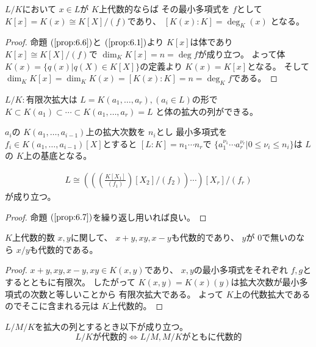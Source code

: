 \documentclass[../master_galois_theory]{subfiles}
\begin{document}
\begin{prop} \label{prop:6.7}
  $L/K$において $x \in L$が $K$上代数的ならば
  その最小多項式を $f$として
  $K[x] = K(x) \cong K[X]/(f)$であり、
  $[K(x):K] = \deg_K (x)$
  となる。
\end{prop}

\begin{proof}
  命題 $(\mathrm{\ref{prop:6.6}})$と $(\mathrm{\ref{prop:6.1}})$より
  $K[x]$は体であり
  $K[x] \cong K[X]/(f)$で $\dim_K K[x] = n = \deg f$が成り立つ。
  よって体 $K(x) = \{ q(x) | q(X) \in K[X] \}$の定義より
  $K(x) = K[x]$となる。
  そして $\dim_K K[x] = \dim_K K(x) = [K(x):K] = n = \deg_K f$である。
\end{proof}

\begin{corl} \label{corl:6.8}
  $L/K:$有限次拡大は
  $L = K(a_1 , \dots , a_r) , (a_i \in L)$の形で
  $K \subset K(a_1) \subset \cdots \subset K(a_1 , \dots , a_r) = L$
  と体の拡大の列ができる。

  $a_i$の $K(a_1 , \dots , a_{i-1})$上の拡大次数を $n_i$とし
  最小多項式を $f_i \in K(a_1 , \dots , a_{i-1})[X]$とすると
  $[L:K] = n_1 \cdots n_r$で
  $\{ a_1^{\nu_1} \cdots a_r^{\nu_r} | 0 \leq \nu_i \leq n_i \}$は
  $L$の $K$上の基底となる。

  \begin{eqnarray*}
    L \cong \left( \left( \left( \frac{K[X_1]}{(f_1)} \right) [X_2]/(f_2) \right) \cdots \right) [X_r]/(f_r)
  \end{eqnarray*}
  が成り立つ。
\end{corl}

\begin{proof}
  命題 $(\mathrm{\ref{prop:6.7}})$を繰り返し用いれば良い。
\end{proof}

\begin{lemm} \label{lemm:daisuuwa}
  $K$上代数的数 $x , y$に関して、 $x + y , xy , x - y$も代数的であり、
  $y$が $0$で無いのなら $x/y$も代数的である。
\end{lemm}

\begin{proof}
  $x + y , xy , x - y , xy \in K(x,y)$であり、
  $x,y$の最小多項式をそれぞれ $f , g$とするとともに有限次。
  したがって $K(x,y) = K(x)(y)$は拡大次数が最小多項式の次数と等しいことから
  有限次拡大である。
  よって $K$上の代数拡大であるのでそこに含まれる元は $K$上代数的。
\end{proof}

\begin{prop}
  $L/M/K$を拡大の列とするとき以下が成り立つ。
  \[
  L/Kが代数的 \Leftrightarrow L/M , M/Kがともに代数的
  \]
\end{prop}
\end{document}
